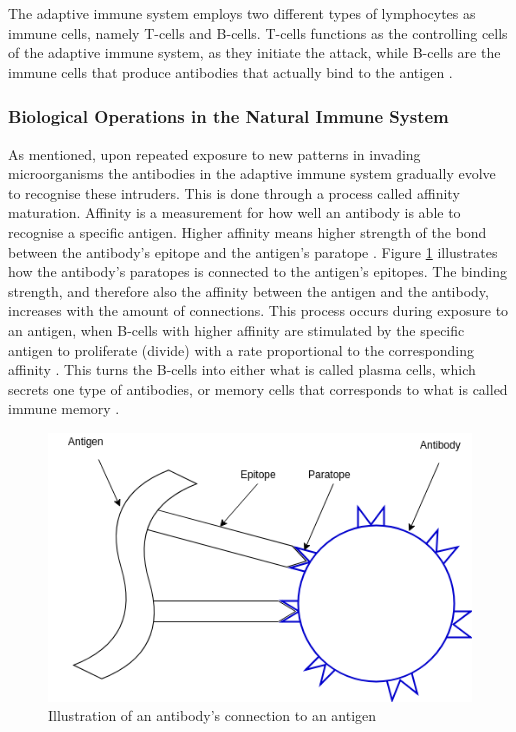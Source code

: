 The adaptive immune system employs two different types of lymphocytes as immune cells, namely T-cells and B-cells. T-cells functions as the controlling cells of the adaptive immune system, as they initiate the attack, while B-cells are the immune cells that produce antibodies that actually bind to the antigen \cite{AIS:Timmis2004}. 


\subsubsection{Biological Operations in the Natural Immune System}
As mentioned, upon repeated exposure to new patterns in invading microorganisms the antibodies in the adaptive immune system gradually evolve to recognise these intruders. This is done through a process called affinity maturation. Affinity is a measurement for how well an antibody is able to recognise a specific antigen. Higher affinity means higher strength of the bond between the antibody's epitope and the antigen's paratope \cite{AIS:ClonalSelection}. Figure \ref{fig:antibody-antigen-connection} illustrates how the antibody's paratopes is connected to the antigen's epitopes. The binding strength, and therefore also the affinity between the antigen and the antibody, increases with the amount of connections.  This process occurs during exposure to an antigen, when B-cells with higher affinity are stimulated by the specific antigen to proliferate (divide) with a rate proportional to the corresponding affinity \cite{AIS:AIRS}. This turns the B-cells into either what is called plasma cells, which secrets one type of antibodies, or memory cells that corresponds to what is called immune memory \cite{AIS:Timmis2004}. 

\begin{figure}
    \centering
    \includegraphics[width=0.8\columnwidth]{figs/antibody-antigen-connection.png}
    \caption{Illustration of an antibody's connection to an antigen}
    \label{fig:antibody-antigen-connection}
\end{figure}

